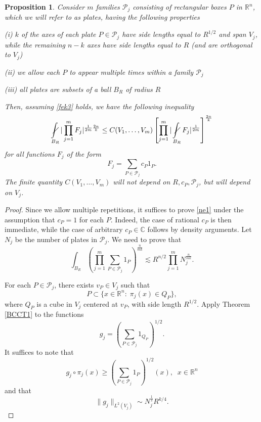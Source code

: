\documentclass[amssymb,amsfonts,12pt]{amsart}
\newtheorem{proposition}[theorem]{Proposition}
\def\R{{\mathbb R}}
\def\C{{\mathbb C}}
\def\P{{\mathcal P}}\def\J{{\mathcal J}}
\begin{document}
\begin{proposition}
\label{nc1}
Consider $m$ families $\P_j$ consisting of rectangular boxes $P$ in $\R^n$, which we will refer to as plates,  having the following properties
\medskip

(i) $k$ of the axes of each plate $P\in\P_j$ have side lengths equal to $R^{1/2}$ and span  $V_j$, while the remaining $n-k$ axes have side lengths  equal to $R$ (and are orthogonal to $V_j$)
\medskip

(ii) we allow each $P$ to appear multiple times within a family $\P_j$
\medskip

(iii) all plates are subsets of a ball $B_R$ of radius $R$
\medskip

Then, assuming \eqref{fek3} holds,  we have the following inequality
\begin{equation}
\label{ne1}
\nint_{B_R}|\prod_{j=1}^mF_j|^{\frac1{2m}\frac{2n}{k}}\le C(V_1,\ldots,V_m) \left[\prod_{j=1}^m|\nint_{B_R}F_j|^{\frac1{2m}}\right]^{\frac{2n}k}
\end{equation}
for all functions  $F_j$ of the form
$$F_j=\sum_{P\in\P_j}c_P1_P.$$
The finite quantity $C(V_1,\ldots,V_m)$ will not depend on $R,c_P,\P_j$, but will depend on $V_j$.
\end{proposition}
\begin{proof}
Since we allow multiple repetitions, it suffices to prove \eqref{ne1} under the assumption that $c_P=1$ for each $P$. Indeed, the case of rational $c_P$ is then  immediate, while the case of arbitrary $c_P\in\C$ follows by density arguments. Let $N_j$ be the number of plates in $\P_j$. We need to prove that
$$\int_{B_R}(\prod_{j=1}^m\sum_{P\in\P_j}1_P)^{\frac{n}{mk}}\lesssim R^{n/2}\prod_{j=1}^mN_j^{\frac{n}{mk}}.$$


For each $P\in\P_j$, there exists $v_P\in V_j$ such that
$$P\subset\{x\in\R^n:\;\pi_j(x)\in Q_P\},$$
where $Q_P$ is a cube in $V_j$ centered at $v_P$, with side length $R^{1/2}$.
Apply Theorem \ref{BCCT1} to the functions
$$g_j=(\sum_{P\in\P_j}1_{Q_P})^{1/2}.$$
It suffices to note that $$g_j\circ\pi_j(x)\ge (\sum_{P\in\P_j}1_P)^{1/2}(x),\;\;x\in\R^n$$
and that $$\|g_j\|_{L^2(V_j)}\sim N_j^{\frac12}R^{k/4}.$$
\end{proof}
\bigskip
\end{document}
